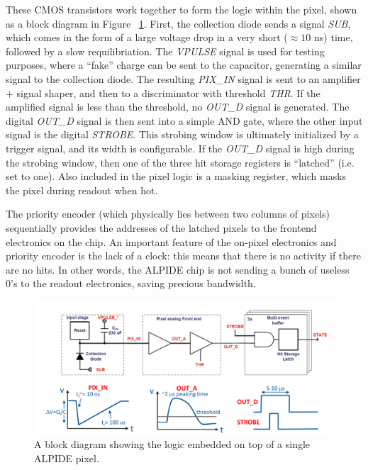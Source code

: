 These CMOS transistors work together to form the logic within the pixel, shown as a block diagram in Figure ~\ref{fig:alpide_l}. First, the collection diode sends a signal \textit{SUB}, which comes in the form of a large voltage drop in a very short ($\approx 10$ ns) time, followed by a slow requilibriation. The \textit{VPULSE} signal is used for testing purposes, where a ``fake'' charge can be sent to the capacitor, generating a similar signal to the collection diode. The resulting \textit{PIX\_IN} signal is sent to an amplifier $+$ signal shaper, and then to a discriminator with threshold \textit{THR}. If the amplified signal is less than the threshold, no \textit{OUT\_D} signal is generated. The digital \textit{OUT\_D} signal is then sent into a simple AND gate, where the other input signal is the digital \textit{STROBE}. This strobing window is ultimately initialized by a trigger signal, and its width is configurable. If the \textit{OUT\_D} signal is high during the strobing window, then one of the three hit storage registers is ``latched'' (i.e. set to one). Also included in the pixel logic is a masking register, which masks the pixel during readout when hot. 

The priority encoder (which physically lies between two columns of pixels) sequentially provides the addresses of the latched pixels to the frontend electronics on the chip. An important feature of the on-pixel electronics and priority encoder is the lack of a clock: this means that there is no activity if there are no hits. In other words, the ALPIDE chip is not sending a bunch of useless 0's to the readout electronics, saving precious bandwidth.

\begin{figure}
    \centering
    \includegraphics[width=1.0\textwidth]{figures/experiment/alpide_logic.png}
    \caption{A block diagram showing the logic embedded on top of a single ALPIDE pixel.}
    \label{fig:alpide_l}
\end{figure}

